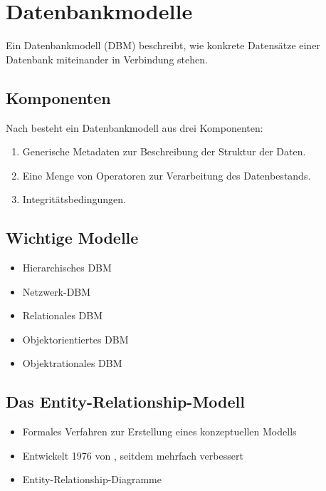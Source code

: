 \chapter{Datenbankmodelle}

Ein
Datenbankmodell (DBM) beschreibt, wie konkrete Datensätze einer Datenbank
miteinander in Verbindung stehen.


\section{Komponenten}

Nach  besteht ein Datenbankmodell aus drei Komponenten:
\begin{enumerate}
\item Generische Metadaten zur Beschreibung der Struktur der Daten.
\item Eine Menge von Operatoren zur Verarbeitung des Datenbestands.
\item Integritätsbedingungen.
\end{enumerate}

\section{Wichtige Modelle}
\begin{itemize}
\item Hierarchisches DBM
\item Netzwerk-DBM
\item Relationales DBM
\item Objektorientiertes DBM
\item Objektrationales DBM
\end{itemize}

\section{Das \foreignlanguage{english}{Entity-Relationship}-Modell}
\begin{itemize}
\item Formales Verfahren zur Erstellung eines konzeptuellen Modells
\item Entwickelt 1976 von , seitdem mehrfach verbessert
%
\item Entity-Relationship\foreignlanguage{ngerman}{-Diagramme}
\end{itemize}

